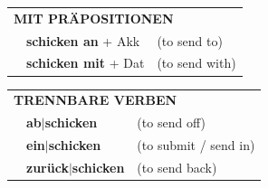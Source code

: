 \documentclass[10pt,a4paper]{revtex4-2}
\begin{document}
\begin{verbbox}
\vspace{10pt}

\begin{tabular}{lll}
\multicolumn{3}{l}{\textbf{MIT PRÄPOSITIONEN}}\\
& \textbf{schicken an} + Akk & (to send to)\\
& \textbf{schicken mit} + Dat & (to send with)\\
\end{tabular}
\hfill
\begin{tabular}{lll}
\multicolumn{3}{l}{\textbf{TRENNBARE VERBEN}}\\
& \textbf{ab$|$schicken} & (to send off)\\
& \textbf{ein$|$schicken} & (to submit / send in)\\
& \textbf{zurück$|$schicken} & (to send back)\\
\end{tabular}
\vspace{-5pt}
\end{verbbox}
\end{document}
